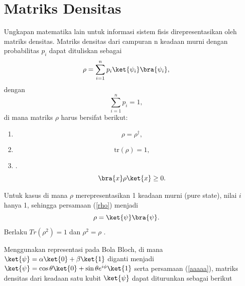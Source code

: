 \section{Matriks Densitas}
\par
Ungkapan matematika lain untuk informasi sistem fisis direpresentasikan oleh matriks densitas. Matriks densitas dari campuran n keadaan murni dengan probabilitas $p_i$ dapat dituliskan sebagai 
\begin{equation}\label{rho}
	\rho=\sum_{i=1}^{n}p_i\ket{\psi_i}\bra{\psi_i},
\end{equation}
dengan
\begin{equation}
	\sum_{i=1}^{n}p_i=1,
\end{equation}
di mana matriks $\rho$ harus bersifat berikut:
\begin{enumerate}
	\item {}
	\begin{equation}
		\rho=\rho^\dag,
	\end{equation}
	\item {}
	\begin{equation}
		\text{tr}(\rho)=1,
	\end{equation}
	\item {}.
	\begin{equation}
		\bra{x}\rho\ket{x}\geq 0.
	\end{equation}
	\par
\end{enumerate}
\par
Untuk kasus di mana $\rho$ merepresentasikan 1 keadaan murni (pure state), nilai $i$ hanya 1, sehingga persamaan (\ref{rho}) menjadi
\begin{equation}\label{aaaaa}
	\rho=\ket{\psi}\bra{\psi}.
\end{equation}
Berlaku $Tr(\rho^2)=1$ dan $\rho^2=\rho$ \cite{nakahara2008quantum}.
\par
Menggunakan representasi pada Bola Bloch, di mana  $\ket{\psi} = \alpha \ket{0} + \beta \ket{1}$ diganti menjadi $\ket{\psi} =\cos\theta\ket{0}+\sin\theta e^{i\phi}\ket{1}$ serta persamaan (\ref{aaaaa}), matriks densitas dari keadaan satu kubit $\ket{\psi}$ dapat diturunkan sebagai berikut
